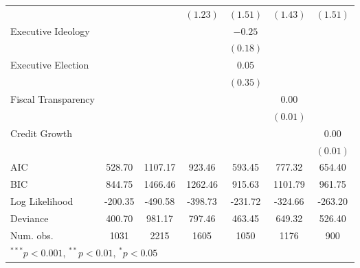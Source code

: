 \begin{tabular}{l c c c c c c }
                            &               &              & $(1.23)$      & $(1.51)$      & $(1.43)$      & $(1.51)$      \\
Executive Ideology          &               &              &               & $-0.25$       &               &               \\
                            &               &              &               & $(0.18)$      &               &               \\
Executive Election          &               &              &               & $0.05$        &               &               \\
                            &               &              &               & $(0.35)$      &               &               \\
Fiscal Transparency         &               &              &               &               & $0.00$        &               \\
                            &               &              &               &               & $(0.01)$      &               \\
Credit Growth               &               &              &               &               &               & $0.00$        \\
                            &               &              &               &               &               & $(0.01)$      \\
\hline
AIC                         & 528.70        & 1107.17      & 923.46        & 593.45        & 777.32        & 654.40        \\
BIC                         & 844.75        & 1466.46      & 1262.46       & 915.63        & 1101.79       & 961.75        \\
Log Likelihood              & -200.35       & -490.58      & -398.73       & -231.72       & -324.66       & -263.20       \\
Deviance                    & 400.70        & 981.17       & 797.46        & 463.45        & 649.32        & 526.40        \\
Num. obs.                   & 1031          & 2215         & 1605          & 1050          & 1176          & 900           \\
\hline
\multicolumn{7}{l}{\scriptsize{$^{***}p<0.001$, $^{**}p<0.01$, $^*p<0.05$}}
\end{tabular}
